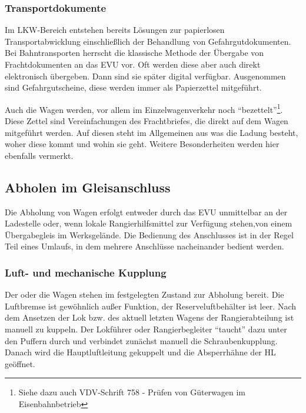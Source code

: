 \subsubsection{Transportdokumente}\label{sec:Transdoc}
Im LKW-Bereich entstehen bereits Lösungen zur papierlosen Transportabwicklung einschließlich der Behandlung von Gefahrgutdokumenten. Bei Bahntransporten herrscht die klassische Methode der Übergabe von Frachtdokumenten an das \acrshort{EVU} vor. Oft werden diese aber auch direkt elektronisch übergeben. Dann sind sie später digital verfügbar. Ausgenommen sind Gefahrgutscheine, diese werden immer als Papierzettel mitgeführt.\par
Auch die Wagen werden, vor allem im Einzelwagenverkehr noch "`bezettelt"'\footnote{Siehe dazu auch VDV-Schrift 758 - Prüfen von Güterwagen im Eisenbahnbetrieb}. Diese Zettel sind Vereinfachungen des Frachtbriefes, die direkt auf dem Wagen mitgeführt werden. Auf diesen steht im Allgemeinen aus was die Ladung besteht, woher diese kommt und wohin sie geht. Weitere Besonderheiten werden hier ebenfalls vermerkt.
\subsection{Abholen im Gleisanschluss}
Die Abholung von Wagen erfolgt entweder durch das \acrshort{EVU} unmittelbar an der Ladestelle oder, wenn lokale Rangierhilfsmittel zur Verfügung stehen,von einem Übergabegleis im Werksgelände. Die Bedienung des Anschlusses ist in der Regel Teil eines Umlaufs, in dem mehrere Anschlüsse nacheinander bedient werden.
\subsubsection{Luft- und mechanische Kupplung}\label{sec:LuftumechKup}
Der oder die Wagen stehen im festgelegten Zustand zur Abholung bereit. Die Luftbremse ist gewöhnlich außer Funktion, der Reserveluftbehälter ist leer. Nach dem Ansetzen der Lok bzw. des aktuell letzten Wagens der Rangierabteilung ist manuell zu kuppeln. Der Lokführer oder Rangierbegleiter "`taucht"' dazu unter den Puffern durch und verbindet zunächst manuell die Schraubenkupplung. Danach wird die Hauptluftleitung gekuppelt und die Absperrhähne der \acrshort{HL} geöffnet. %
